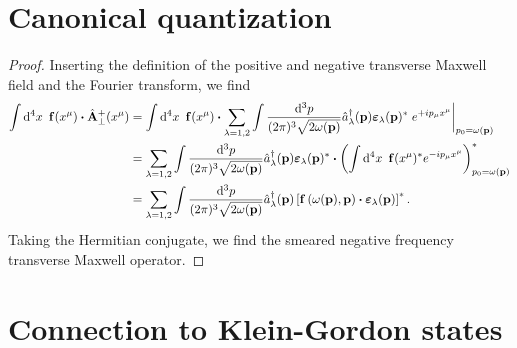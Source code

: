 \section{Canonical quantization}

\begin{proof}
	Inserting the definition of the positive and negative transverse Maxwell field and the Fourier transform, we find
	\begin{equation*}
		\begin{split}
			\int\dd[4]{x}\
			\vb{f}(x^\mu)
			\vdot
			\hat{\vb{A}}_\perp^+(x^\mu)
			&=
			\int\dd[4]{x}\
			\vb{f}(x^\mu)
			\vdot
			\sum_{\lambda=1,2}
			\int\frac{\dd[3]{p}}{(2\pi)^3\sqrt{2\omega(\vb{p})}}
			\hat{a}_\lambda^\dagger(\vb{p})
			\boldsymbol{\varepsilon}_\lambda(\vb{p})^*
			\eval{e^{+ip_\mu x^\mu}}_{p_0=\omega(\vb{p})}
			\\
			&=
			\sum_{\lambda=1,2}
			\int\frac{\dd[3]{p}}{(2\pi)^3\sqrt{2\omega(\vb{p})}}
			\hat{a}_\lambda^\dagger(\vb{p})
			\boldsymbol{\varepsilon}_\lambda(\vb{p})^*
			\vdot
			\left(
				\int\dd[4]{x}\
				\vb{f}(x^\mu)^*
				e^{-ip_\mu x^\mu}
			\right)_{p_0=\omega(\vb{p})}^*
			\\
			&=
			\sum_{\lambda=1,2}
			\int\frac{\dd[3]{p}}{(2\pi)^3\sqrt{2\omega(\vb{p})}}
			\hat{a}_\lambda^\dagger(\vb{p})
			\left[
				\vb{f}\left(\omega(\vb{p}),\vb{p}\right)
				\vdot
				\boldsymbol{\varepsilon}_\lambda(\vb{p})
			\right]^*
			.
		\end{split}
	\end{equation*}
	Taking the Hermitian conjugate, we find the smeared negative frequency transverse Maxwell operator.
\end{proof}

\section{Connection to Klein-Gordon states}

